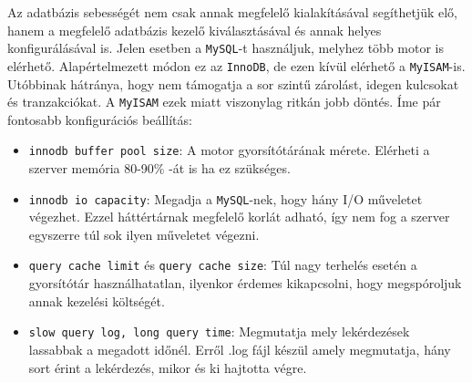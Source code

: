 Az adatbázis sebességét nem csak annak megfelelő kialakításával segíthetjük elő, hanem a megfelelő adatbázis kezelő kiválasztásával és annak helyes konfigurálásával is.
Jelen esetben a \texttt{MySQL}-t használjuk, melyhez több motor is elérhető. Alapértelmezett módon ez az \texttt{InnoDB}, de ezen kívül elérhető a \texttt{MyISAM}-is. Utóbbinak hátránya, hogy nem támogatja a sor szintű zárolást, idegen kulcsokat és tranzakciókat. A \texttt{MyISAM} ezek miatt viszonylag ritkán jobb döntés. Íme pár fontosabb konfigurációs beállítás: \cite{other_optimization}
\begin{itemize}
\item \texttt{innodb buffer pool size}: A motor gyorsítótárának mérete. Elérheti a szerver memória 80-90\% -át is ha ez szükséges.
\item \texttt{innodb io capacity}: Megadja a \texttt{MySQL}-nek, hogy hány I/O műveletet végezhet. Ezzel háttértárnak megfelelő korlát adható, így nem fog a szerver  egyszerre túl sok ilyen műveletet végezni.
\item \texttt{query cache limit} és \texttt{query cache size}: Túl nagy terhelés esetén a gyorsítótár használhatatlan, ilyenkor érdemes kikapcsolni, hogy megspóroljuk annak kezelési költségét.
\item \texttt{slow query log, long query time}: Megmutatja mely lekérdezések lassabbak a megadott időnél. Erről .log fájl készül amely megmutatja, hány sort érint a lekérdezés, mikor és ki hajtotta végre.
\end{itemize}
